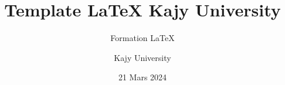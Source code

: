\documentclass[11pt,fancy,authorye]{elegantbook}
\title{Template \LaTeX{} Kajy University}
\subtitle{Formation \LaTeX{} }
\author{Kajy University}
\date{21 Mars 2024}
\begin{document}
	
	\maketitle
	
	\frontmatter
	\tableofcontents
	
	\mainmatter


\nocite{*}

	
\end{document}
